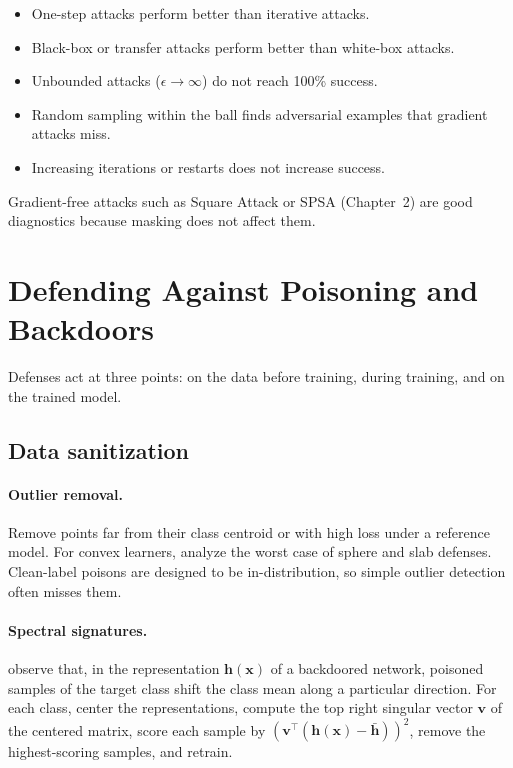 \documentclass[10pt,a4paper]{extarticle}
\theoremstyle{definition}
\newcommand{\x}{\mathbf{x}}
\begin{document}
\begin{keybox}
\begin{itemize}
  \item One-step attacks perform better than iterative attacks.
  \item Black-box or transfer attacks perform better than white-box attacks.
  \item Unbounded attacks (\(\epsilon\to\infty\)) do not reach 100\% success.
  \item Random sampling within the ball finds adversarial examples that gradient attacks miss.
  \item Increasing iterations or restarts does not increase success.
\end{itemize}
Gradient-free attacks such as Square Attack or SPSA (Chapter~2) are good diagnostics because masking does not affect them.
\end{keybox}

\section{Defending Against Poisoning and Backdoors}

Defenses act at three points: on the data before training, during training, and on the trained model.

\subsection{Data sanitization}

\paragraph{Outlier removal.} Remove points far from their class centroid or with high loss under a reference model. For convex learners, \citet{steinhardt2017certified} analyze the worst case of sphere and slab defenses. Clean-label poisons are designed to be in-distribution, so simple outlier detection often misses them.

\paragraph{Spectral signatures.} \citet{tran2018spectral} observe that, in the representation \(\mathbf{h}(\x)\) of a backdoored network, poisoned samples of the target class shift the class mean along a particular direction. For each class, center the representations, compute the top right singular vector \(\mathbf{v}\) of the centered matrix, score each sample by \((\mathbf{v}^\top(\mathbf{h}(\x)-\bar{\mathbf{h}}))^2\), remove the highest-scoring samples, and retrain.
\end{document}
